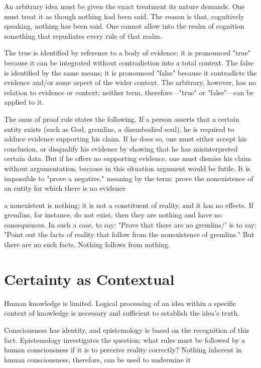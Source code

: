         An arbitrary idea must be given the exact treatment its nature demands. One must treat it as though nothing had been said. The reason is that, cognitively speaking, nothing has been said. One cannot allow into the realm of cognition something that repudiates every rule of that realm.
        
        The true is identified by reference to a body of evidence; it is pronounced "true" because it can be integrated without contradiction into a total context. The false is identified by the same means; it is pronounced "false" because it contradicts the evidence and/or some aspect of the wider context. The arbitrary, however, has no relation to evidence or context; neither term, therefore—"true" or "false"—can be applied to it.
        
        The onus of proof rule states the following. If a person asserts that a certain entity exists (such as God, gremlins, a disembodied soul), he is required to adduce evidence supporting his claim. If he does so, one must either accept his conclusion, or disqualify his evidence by showing that he has misinterpreted certain data. But if he offers no supporting evidence, one must dismiss his claim without argumentation, because in this situation argument would be futile. It is impossible to "prove a negative," meaning by the term: prove the nonexistence of an entity for which there is no evidence
        
        a nonexistent is nothing; it is not a constituent of reality, and it has no effects. If gremlins, for instance, do not exist, then they are nothing and have no consequences. In such a case, to say: "Prove that there are no gremlins/' is to say: "Point out the facts of reality that follow from the nonexistence of gremlins." But there are no such facts. Nothing follows from nothing.

    \section{Certainty as Contextual}
    
        Human knowledge is limited. Logical processing of an idea within a specific context of knowledge is necessary and sufficient to establish the idea's truth.
        
        Consciousness has identity, and epistemology is based on the recognition of this fact. Epistemology investigates the question: what rules must be followed by a human consciousness if it is to perceive reality correctly? Nothing inherent in human consciousness, therefore, can be used to undermine it

